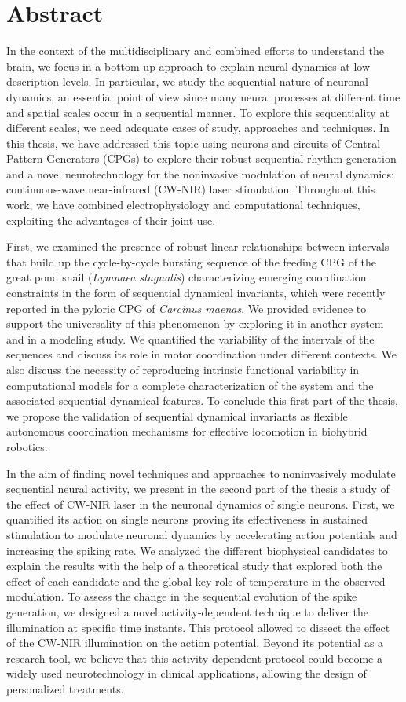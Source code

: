 \chapter*{Abstract}
In the context of the multidisciplinary and combined efforts to understand the brain, we focus in a bottom-up approach to explain neural dynamics at low description levels. In particular, we study the sequential nature of neuronal dynamics, an essential point of view since many neural processes at different time and spatial scales occur in a sequential manner. To explore this sequentiality at different scales, we need adequate cases of study, approaches and techniques. In this thesis, we have addressed this topic using neurons and circuits of Central Pattern Generators (CPGs) to explore their robust sequential rhythm generation and a novel neurotechnology for the noninvasive modulation of neural dynamics: continuous-wave near-infrared (CW-NIR) laser stimulation. Throughout this work, we have combined electrophysiology and computational techniques, exploiting the advantages of their joint use. 

First, we examined the presence of robust linear relationships between intervals that build up the cycle-by-cycle bursting sequence of the feeding CPG of the great pond snail (\textit{Lymnaea stagnalis}) characterizing emerging coordination constraints in the form of sequential dynamical invariants, which were recently reported in the pyloric CPG of \textit{Carcinus maenas}. We provided evidence to support the universality of this phenomenon by exploring it in another system and in a modeling study. We quantified the variability of the intervals of the sequences and discuss its role in motor coordination under different contexts. We also discuss the necessity of reproducing intrinsic functional variability in computational models for a complete characterization of the system and the associated sequential dynamical features. To conclude this first part of the thesis, we propose the validation of sequential dynamical invariants as flexible autonomous coordination mechanisms for  effective locomotion in biohybrid robotics. 

In the aim of finding novel techniques and approaches to noninvasively modulate sequential neural activity, we present in the second part of the thesis a study of the effect of CW-NIR laser in the neuronal dynamics of single neurons. First, we quantified its action on single neurons proving its effectiveness in sustained stimulation to modulate neuronal dynamics by accelerating action potentials and increasing the spiking rate. We analyzed the different biophysical candidates to explain the results with the help of a theoretical study that explored both the effect of each candidate and the global key role of temperature in the observed modulation. To assess the change in the sequential evolution of the spike generation, we designed a novel activity-dependent technique to deliver the illumination at specific time instants. This protocol allowed to dissect the effect of the CW-NIR illumination on the action potential. Beyond its potential as a research tool, we believe that this activity-dependent protocol could become a widely used neurotechnology in clinical applications, allowing the design of personalized treatments. 


